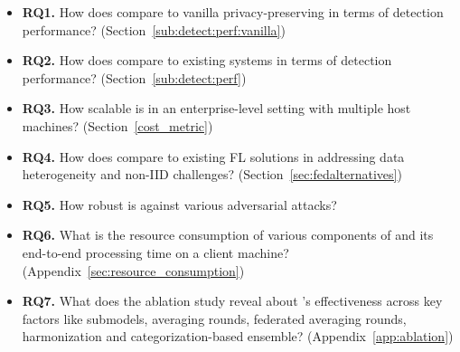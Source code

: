 


\begin{itemize}[leftmargin=*,itemsep=0.1em, parsep=0em, topsep=0em]
  \item \textbf{RQ1.} How does \Sys compare to vanilla privacy-preserving \pids in terms of detection performance? (Section~\ref{sub:detect:perf:vanilla})
  \item \textbf{RQ2.} How does \Sys compare to existing systems in terms of detection performance? (Section~\ref{sub:detect:perf})
  \item \textbf{RQ3.} How scalable is \Sys in an enterprise-level setting with multiple host machines? (Section~\ref{cost_metric})
  \item \textbf{RQ4.} How does \Sys compare to existing FL solutions in addressing data heterogeneity and non-IID challenges? (Section~\ref{sec:fedalternatives})
  \item \textbf{RQ5.} How robust is \Sys against various adversarial attacks?
  
  \item \textbf{RQ6.} What is the resource consumption of various components of \Sys and its end-to-end processing time on a client machine? (Appendix~\ref{sec:resource_consumption})
  \item \textbf{RQ7.} What does the ablation study reveal about \Sys's effectiveness across key factors like \gnnshort submodels, averaging rounds, federated averaging rounds, \wordvec harmonization and categorization-based \gnnshort ensemble? (Appendix~\ref{app:ablation})
  
  \end{itemize}  


